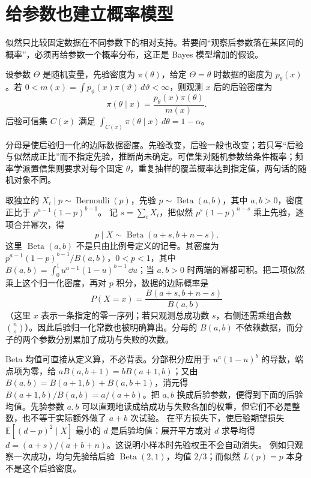 \section{给参数也建立概率模型}

似然只比较固定数据在不同参数下的相对支持。若要问“观察后参数落在某区间的概率”，必须再给参数一个概率分布，这正是 Bayes 模型增加的假设。

\begin{definition}[先验、后验与可信集]
设参数 \(\Theta\) 是随机变量，先验密度为 \(\pi(\theta)\)，给定 \(\Theta=\theta\) 时数据的密度为 \(p_\theta(x)\)。若
\(0<m(x)=\int p_\vartheta(x)\pi(\vartheta)\,d\vartheta<\infty\)，则观测 \(x\) 后的后验密度为
\[
\pi(\theta\mid x)=\frac{p_\theta(x)\pi(\theta)}{m(x)}.
\]
后验可信集 \(C(x)\) 满足
\(\int_{C(x)}\pi(\theta\mid x)\,d\theta=1-\alpha\)。
\end{definition}

分母是使后验归一化的边际数据密度。先验改变，后验一般也改变；若只写“后验与似然成正比”而不指定先验，推断尚未确定。可信集对随机参数给条件概率；频率学派置信集则要求对每个固定 \(\theta\)，重复抽样的覆盖概率达到指定值，两句话的随机对象不同。

取独立的 \(X_i\mid p\sim\operatorname{Bernoulli}(p)\)，先验
\(p\sim\operatorname{Beta}(a,b)\)，其中 \(a,b>0\)，密度正比于
\(p^{a-1}(1-p)^{b-1}\)。
记 \(s=\sum_iX_i\)，把似然 \(p^s(1-p)^{n-s}\) 乘上先验，逐项合并幂次，得
\[
p\mid X\sim\operatorname{Beta}(a+s,b+n-s).
\]
这里 \(\operatorname{Beta}(a,b)\) 不是只由比例号定义的记号。其密度为
\(p^{a-1}(1-p)^{b-1}/B(a,b)\)，\(0<p<1\)，其中
\(B(a,b)=\int_0^1u^{a-1}(1-u)^{b-1}\,\dd u\)；当
\(a,b>0\) 时两端的幂都可积。把二项似然乘上这个归一化密度，再对 \(p\) 积分，数据的边际概率是
\[
P(X=x)=\frac{B(a+s,b+n-s)}{B(a,b)}
\]
（这里 \(x\) 表示一条指定的零一序列；若只观测总成功数 \(s\)，右侧还需乘组合数 \(\binom ns\)）。因此后验归一化常数也被明确算出。分母的 \(B(a,b)\) 不依赖数据，而分子的两个参数分别累加了成功与失败的次数。

Beta 均值可直接从定义算，不必背表。分部积分应用于
\(u^a(1-u)^b\) 的导数，端点项为零，给
\(aB(a,b+1)=bB(a+1,b)\)；又由
\(B(a,b)=B(a+1,b)+B(a,b+1)\)，消元得
\(B(a+1,b)/B(a,b)=a/(a+b)\)。把 \(a,b\) 换成后验参数，便得到下面的后验均值。先验参数 \(a,b\) 可以直观地读成给成功与失败各加的权重，但它们不必是整数，也不等于实际额外做了 \(a+b\) 次试验。
在平方损失下，使后验期望损失
\(\mathbb E[(d-p)^2\mid X]\) 最小的 \(d\) 是后验均值：展开平方或对 \(d\) 求导均得
\(d=(a+s)/(a+b+n)\)。这说明小样本时先验权重不会自动消失。
例如只观察一次成功，均匀先验给后验 \(\operatorname{Beta}(2,1)\)，均值 \(2/3\)；而似然 \(L(p)=p\) 本身不是这个后验密度。


